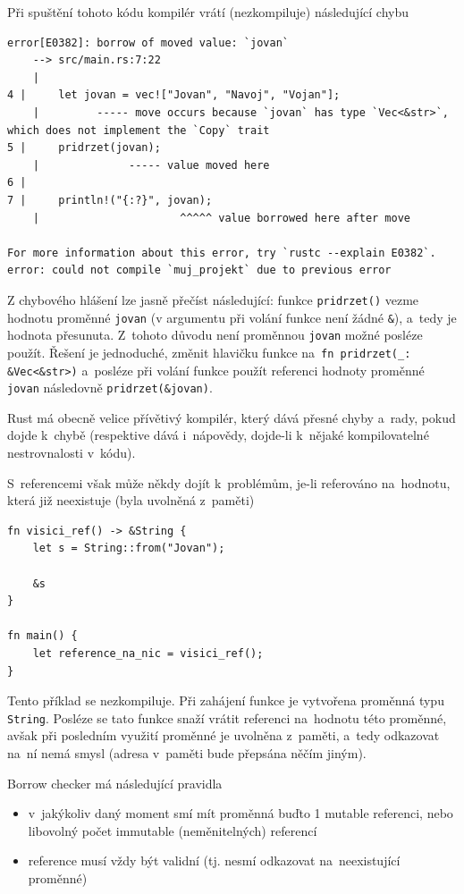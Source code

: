 \documentclass[a4paper, 12pt, twoside]{article} %
\newcommand{\rust}[1]{\texttt{#1}}
\begin{document}
			Při spuštění tohoto kódu kompilér vrátí (nezkompiluje) následující chybu
			\begin{verbatim}
error[E0382]: borrow of moved value: `jovan`
	--> src/main.rs:7:22
	|
4 |     let jovan = vec!["Jovan", "Navoj", "Vojan"];
	|         ----- move occurs because `jovan` has type `Vec<&str>`, which does not implement the `Copy` trait
5 |     pridrzet(jovan);    
	|              ----- value moved here
6 | 
7 |     println!("{:?}", jovan);
	|                      ^^^^^ value borrowed here after move

For more information about this error, try `rustc --explain E0382`.
error: could not compile `muj_projekt` due to previous error
			\end{verbatim}
				
			Z chybového hlášení lze jasně přečíst následující: funkce \rust{pridrzet()} vezme hodnotu proměnné \texttt{jovan} (v argumentu při volání funkce není žádné \rust{&}), a~tedy je hodnota přesunuta. Z~tohoto důvodu není proměnnou \texttt{jovan} možné posléze použít. Řešení je jednoduché, změnit hlavičku funkce na~\rust{fn pridrzet(_: &Vec<&str>)} a~posléze při volání funkce použít referenci hodnoty proměnné \texttt{jovan} následovně \rust{pridrzet(&jovan)}.
				
			Rust má obecně velice přívětivý kompilér, který dává přesné chyby a~rady, pokud dojde k~chybě (respektive dává i~nápovědy, dojde-li k~nějaké kompilovatelné nestrovnalosti v~kódu).
			
			S~referencemi však může někdy dojít k~problémům, je-li referováno na~hodnotu, která již neexistuje (byla uvolněná z~paměti)
			\begin{verbatim}
fn visici_ref() -> &String {
	let s = String::from("Jovan");

	&s
}

fn main() {
	let reference_na_nic = visici_ref();
}
			\end{verbatim}
			\cite{dangle}
				
			Tento příklad se nezkompiluje. Při zahájení funkce je vytvořena proměnná typu \rust{String}. Posléze se tato funkce snaží vrátit referenci na~hodnotu této proměnné, avšak při posledním využití proměnné je uvolněna z~paměti, a~tedy odkazovat na~ní nemá smysl (adresa v~paměti bude přepsána něčím jiným).
	
			Borrow checker má následující pravidla
			\begin{itemize}
				\item v~jakýkoliv daný moment smí mít proměnná buďto 1 mutable referenci, nebo libovolný počet immutable (neměnitelných) referencí
				\item reference musí vždy být validní (tj. nesmí odkazovat na~neexistující proměnné)
			\end{itemize}
	
\end{document}
